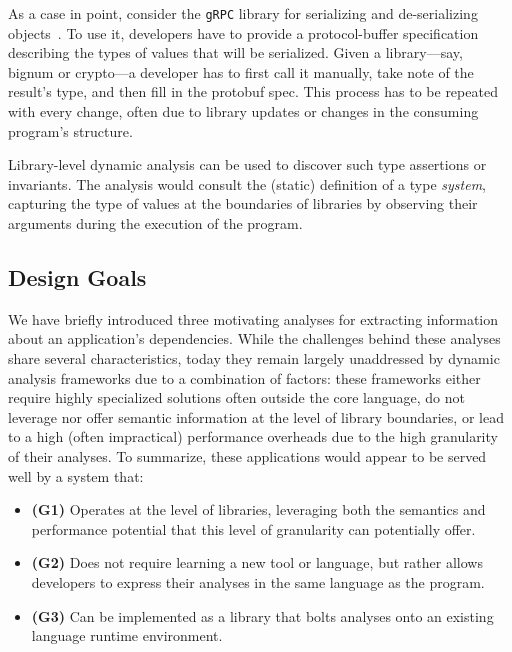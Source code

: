 \documentclass[letterpaper,twocolumn,10pt]{article}
\newcommand{\heading}[1]{\vspace{2pt}\noindent\textbf{#1}\enspace}
\newcommand{\ttt}[1]{\texttt{#1}}
\begin{document}
As a case in point, consider the \ttt{gRPC} library for serializing and de-serializing objects~\cite{grpc}.
To use it, developers have to provide a protocol-buffer specification describing the types of values that will be serialized.
Given a library---say, bignum or crypto---a developer has to first call it manually, take note of the result's type, and then fill in the protobuf spec. %
This process has to be repeated with every change, often due to library updates or changes in the consuming program's structure.

Library-level dynamic analysis can be used to discover such type assertions or invariants.
The analysis would consult the (static) definition of a type \emph{system}, capturing the type of values at the boundaries of libraries by observing their arguments during the execution of the program.




\subsection{Design Goals}
\label{goals}

We have briefly introduced three motivating analyses for extracting information about an application's dependencies.
While the challenges behind these analyses share several characteristics, today they remain largely unaddressed by dynamic analysis frameworks due to a combination of factors:
  these frameworks either require highly specialized solutions often outside the core language,
  do not leverage nor offer semantic information at the level of library boundaries, or
  lead to a high (often impractical) performance overheads due to the high granularity of their analyses.
To summarize, these applications would appear to be served well by a system that:
\begin{itemize}
  \item \textbf{(G1)} Operates at the level of libraries, leveraging both the semantics and performance potential that this level of granularity can potentially offer.
  \item \textbf{(G2)} Does not require learning a new tool or language, but rather allows developers to express their analyses in the same language as the program.
  \item \textbf{(G3)} Can be implemented as a library that bolts analyses onto an existing language runtime environment.
\end{itemize}
\end{document}
